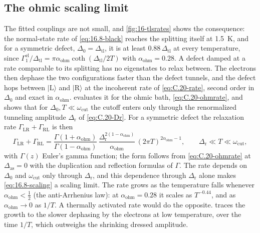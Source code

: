\subsection{The ohmic scaling limit}\label{sec:16.8-ohmic}

The fitted couplings are not small, and \cref{fig:16-tlsrates} shows the consequence: the normal-state rate of \cref{eq:16.8-black} reaches the splitting itself at \SI{1.5}{K}, and for a symmetric defect, $\Delta_0 = \Delta_{\mathrm{tl}}$, it is at least $0.88\,\Delta_{\mathrm{tl}}$ at every temperature, since $\varGamma_1^{\mathrm{el}}/\Delta_{\mathrm{tl}} = \pi\alpha_{\mathrm{ohm}}\coth(\Delta_{\mathrm{tl}}/2T)$ with $\alpha_{\mathrm{ohm}} = 0.28$. A defect damped at a rate comparable to its splitting has no eigenstates to relax between. The electrons then dephase the two configurations faster than the defect tunnels, and the defect hops between $|\mathrm{L}\rangle$ and $|\mathrm{R}\rangle$ at the incoherent rate of \cref{eq:C.20-rate}, second order in $\Delta_0$ and exact in $\alpha_{\mathrm{ohm}}$.  evaluates it for the ohmic bath, \cref{eq:C.20-ohmrate}, and shows that for $\Delta_0, T \ll \omega_{\mathrm{cut}}$ the cutoff enters only through the renormalized tunneling amplitude $\Delta_{\mathrm{r}}$ of \cref{eq:C.20-Dr}. For a symmetric defect the relaxation rate $\varGamma_{\mathrm{LR}} + \varGamma_{\mathrm{RL}}$ is then
\begin{equation}
  \varGamma_{\mathrm{LR}} + \varGamma_{\mathrm{RL}} = \frac{\Gamma(1 + \alpha_{\mathrm{ohm}})}{\Gamma(1 - \alpha_{\mathrm{ohm}})}\,\frac{\Delta_{\mathrm{r}}^{2(1 - \alpha_{\mathrm{ohm}})}}{\alpha_{\mathrm{ohm}}}\,(2\pi T)^{2\alpha_{\mathrm{ohm}} - 1} ,
  \qquad \Delta_{\mathrm{r}} \ll T \ll \omega_{\mathrm{cut}} ,
  \label{eq:16.8-scaling}
\end{equation}
with $\Gamma(z)$ Euler's gamma function; the form follows from \cref{eq:C.20-ohmrate} at $\Delta_{\mathrm{as}} = 0$ with the duplication and reflection formulas of $\Gamma$. The rate depends on $\Delta_0$ and $\omega_{\mathrm{cut}}$ only through $\Delta_{\mathrm{r}}$, and this dependence through $\Delta_{\mathrm{r}}$ alone makes \cref{eq:16.8-scaling} a scaling limit. The rate grows as the temperature falls whenever $\alpha_{\mathrm{ohm}} < \tfrac12$ (the anti-Arrhenius law): at $\alpha_{\mathrm{ohm}} = 0.28$ it scales as $T^{-0.44}$, and as $\alpha_{\mathrm{ohm}} \to 0$ as $1/T$. A thermally activated rate would do the opposite.  traces the growth to the slower dephasing by the electrons at low temperature, over the time $1/T$, which outweighs the shrinking dressed amplitude.

